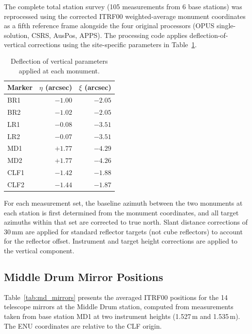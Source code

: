 \documentclass[11pt,letterpaper]{article}
\begin{document}
The complete total station survey (105 measurements from 6 base stations) was reprocessed using the corrected ITRF00 weighted-average monument coordinates as a fifth reference frame alongside the four original processors (OPUS single-solution, CSRS, AusPos, APPS). The processing code applies deflection-of-vertical corrections using the site-specific parameters in Table~\ref{tab:deflection}.

\begin{table}[H]
\centering
\caption{Deflection of vertical parameters applied at each monument.}
\label{tab:deflection}
\smallskip
\begin{tabular}{@{}lrr@{}}
\toprule
{Marker} & {$\eta$ (arcsec)} & {$\xi$ (arcsec)} \\
\midrule
BR1  & $-1.00$ & $-2.05$ \\
BR2  & $-1.02$ & $-2.05$ \\
LR1  & $-0.08$ & $-3.51$ \\
LR2  & $-0.07$ & $-3.51$ \\
MD1  & $+1.77$ & $-4.29$ \\
MD2  & $+1.77$ & $-4.26$ \\
CLF1 & $-1.42$ & $-1.88$ \\
CLF2 & $-1.44$ & $-1.87$ \\
\bottomrule
\end{tabular}
\end{table}

\noindent For each measurement set, the baseline azimuth between the two monuments at each station is first determined from the monument coordinates, and all target azimuths within that set are corrected to true north. Slant distance corrections of 30\,mm are applied for standard reflector targets (not cube reflectors) to account for the reflector offset. Instrument and target height corrections are applied to the vertical component.

\subsection{Middle Drum Mirror Positions}

Table~\ref{tab:md_mirrors} presents the averaged ITRF00 positions for the 14 telescope mirrors at the Middle Drum station, computed from measurements taken from base station MD1 at two instrument heights (1.527\,m and 1.535\,m). The ENU coordinates are relative to the CLF origin.
\end{document}
